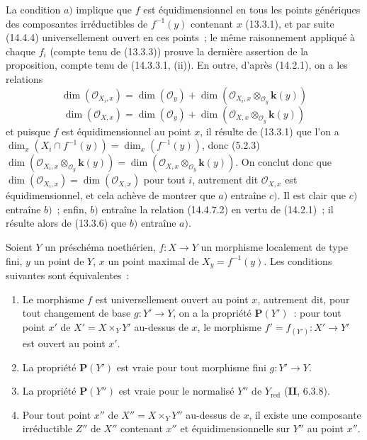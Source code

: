 La condition $a)$ implique que $f$ est équidimensionnel en tous les points
génériques des composantes irréductibles de $f^{-1}(y)$ contenant $x$ (13.3.1), et
par suite (14.4.4) universellement ouvert en ces points~; le même raisonnement
appliqué à chaque $f_i$ (compte tenu de (13.3.3)) prouve la dernière assertion de
la proposition, compte tenu de (14.3.3.1, (ii)). En outre, d'après (14.2.1), on a
les relations
\begin{equation}
\tag{14.4.7.1}
\label{IV.14.4.7.1-fr}
  \dim(\mathcal O_{X_i,x})=\dim(\mathcal O_y)+
  \dim(\mathcal O_{X_i,x}\otimes_{\mathcal O_y}\boldsymbol{k}(y))
\end{equation}
\begin{equation}
\tag{14.4.7.2}
\label{IV.14.4.7.2-fr}
  \dim(\mathcal O_{X,x})=\dim(\mathcal O_y)+
  \dim(\mathcal O_{X,x}\otimes_{\mathcal O_y}\boldsymbol{k}(y))
\end{equation}
et puisque $f$ est équidimensionnel au point $x$, il résulte de (13.3.1) que l'on
a $\dim_x(X_i\cap f^{-1}(y))=\dim_x(f^{-1}(y))$, donc (5.2.3)
$\dim(\mathcal O_{X_i,x}\otimes_{\mathcal O_y}\boldsymbol{k}(y))=
\dim(\mathcal O_{X,x}\otimes_{\mathcal O_y}\boldsymbol{k}(y))$.
On conclut donc que $\dim(\mathcal O_{X_i,x})=\dim(\mathcal O_{X,x})$ pour tout
$i$, autrement dit $\mathcal O_{X,x}$ est équidimensionnel, et cela achève de
montrer que $a)$ entraîne $c)$. Il est clair que $c)$ entraîne $b)$~; enfin, $b)$
entraîne la relation (14.4.7.2) en vertu de (14.2.1)~; il résulte alors de (13.3.6)
que $b)$ entraîne $a)$.

\begin{proposition}[14.4.8]
\label{IV.14.4.8-fr}
Soient $Y$ un préschéma noethérien, $f:X\to Y$ un morphisme localement de type
fini, $y$ un point de $Y$, $x$ un point maximal de $X_y=f^{-1}(y)$. Les conditions
suivantes sont équivalentes~:
\begin{enumerate}[label=\emph{\alph*)}]
  \item Le morphisme $f$ est universellement ouvert au point $x$, autrement dit,
  pour \textup{tout} changement de base $g:Y'\to Y$, on a la propriété $\boldsymbol{P}(Y')$~: pour tout
  point $x'$ de $X'=X\times_Y Y'$ au-dessus de $x$, le morphisme
  $f'=f_{(Y')}:X'\to Y'$ est ouvert au point $x'$.


  \item[\textup{a$'$)}] La propriété $\boldsymbol{P}(Y')$ est vraie pour tout morphisme \textup{fini}
  $g:Y'\to Y$.
  \item[\textup{a$''$)}] La propriété $\boldsymbol{P}(Y'')$ est vraie pour le \textup{normalisé} $Y''$ de
  $Y_{\mathrm{red}}$ \textup{(\textbf{II}, 6.3.8)}.
  \item Pour tout point $x''$ de $X''=X\times_Y Y''$ au-dessus de $x$, il existe
  une composante irréductible $Z''$ de $X''$ contenant $x''$ et
  équidimensionnelle sur $Y''$ au point $x''$.
\end{enumerate}
\end{proposition}

